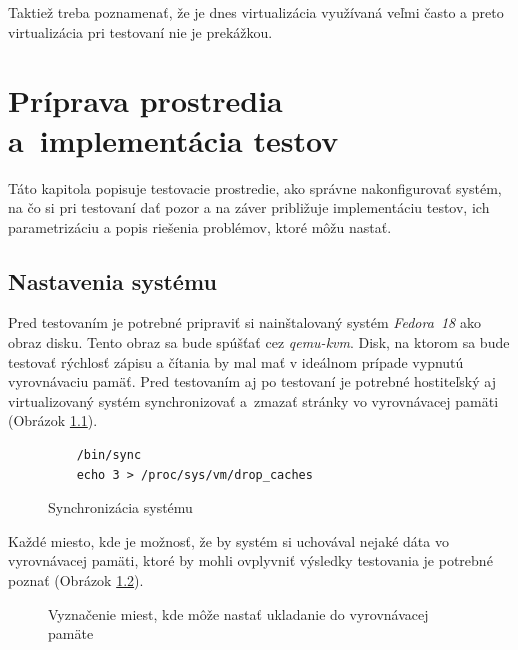 Taktiež treba poznamenať, že je dnes virtualizácia využívaná veľmi často a
preto virtualizácia pri testovaní nie je prekážkou.

%
%

\chapter{Príprava prostredia a~implementácia testov}

Táto kapitola popisuje testovacie prostredie, ako správne nakonfigurovať
systém, na čo si pri testovaní dať pozor a na záver približuje implementáciu
testov, ich parametrizáciu a popis riešenia problémov, ktoré môžu nastať.

\section{Nastavenia systému}

Pred testovaním je potrebné pripraviť si nainštalovaný systém \emph{Fedora~18}
ako obraz disku. Tento obraz sa bude spúšťať cez \emph{qemu-kvm}. Disk, na
ktorom sa bude testovať rýchlosť zápisu a čítania by mal mať v ideálnom prípade
vypnutú vyrovnávaciu pamäť.  Pred testovaním aj po testovaní je potrebné
hostiteľský aj virtualizovaný systém synchronizovať a~zmazať stránky vo
vyrovnávacej pamäti (Obrázok \ref{alg:sync}).

\begin{figure}[H]
\begin{lstlisting}
    /bin/sync
    echo 3 > /proc/sys/vm/drop_caches
\end{lstlisting}
\caption{Synchronizácia systému}
\label{alg:sync}
\end{figure}

Každé miesto, kde je možnosť, že by systém si uchovával nejaké dáta vo
vyrovnávacej pamäti, ktoré by mohli ovplyvniť výsledky testovania je potrebné
poznať (Obrázok \ref{graf-cache}).

\begin{figure}[H]
\begin{center}
  \caption{Vyznačenie miest, kde môže nastať ukladanie do vyrovnávacej pamäte}
  \label{graf-cache}
\end{center}
\end{figure}

